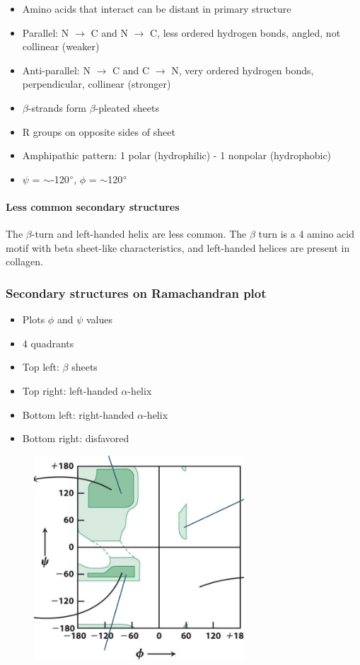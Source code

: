 \documentclass[letterpaper, 12pt]{article}
\begin{document}
\begin{itemize}
\item Amino acids that interact can be distant in primary structure
\item Parallel: N $\to$ C and N $\to$ C, less ordered hydrogen bonds, angled, not collinear (weaker)
\item Anti-parallel: N $\to$ C and C $\to$ N, very ordered hydrogen bonds, perpendicular, collinear (stronger)
\item $\beta$-strands form $\beta$-pleated sheets
\item R groups on opposite sides of sheet
\item Amphipathic pattern: 1 polar (hydrophilic) - 1 nonpolar (hydrophobic)
\item $\psi$ = $\sim$-120$\degree$, $\phi$ = $\sim$120$\degree$
\end{itemize}

\paragraph{Less common secondary structures} The $\beta$-turn and left-handed helix are less common. The $\beta$ turn is a 4 amino acid motif with beta sheet-like characteristics, and left-handed helices are present in collagen.

\subsubsection*{Secondary structures on Ramachandran plot}

\begin{itemize}
\item Plots $\phi$ and $\psi$ values
\item 4 quadrants
\item Top left: $\beta$ sheets
\item Top right: left-handed $\alpha$-helix
\item Bottom left: right-handed $\alpha$-helix
\item Bottom right: disfavored
\end{itemize}

\begin{figure}[H]
\centering
\includegraphics[width=0.7\textwidth]{ramachandran}
\end{figure}
\end{document}

